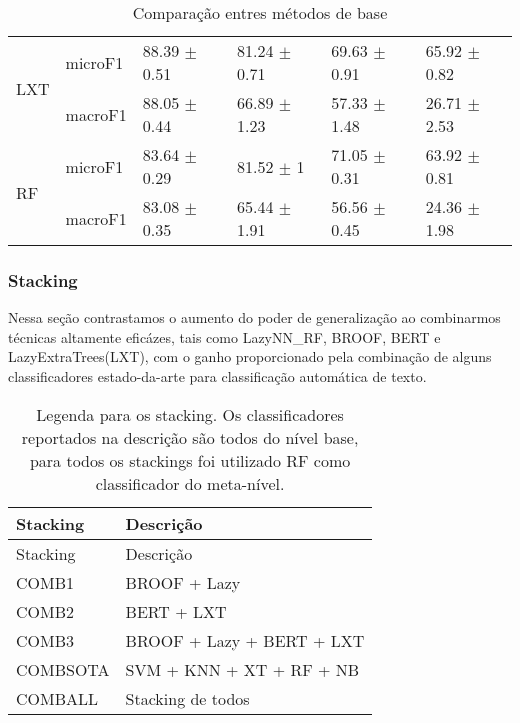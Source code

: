 \documentclass[]{article}
\begin{document}
\begin{table}[ht]
\begin{tabular}{llllll}
   \cline{3-6}\multirow{2}{*}{LXT} & microF1 & 88.39 $\pm$  0.51 & 81.24 $\pm$  0.71 & 69.63 $\pm$  0.91 & 65.92 $\pm$  0.82 \\ 
   & macroF1 & 88.05 $\pm$  0.44 & 66.89 $\pm$  1.23 & 57.33 $\pm$  1.48 & 26.71 $\pm$  2.53 \\ 
   \cline{3-6}\multirow{2}{*}{RF} & microF1 & 83.64 $\pm$  0.29 & 81.52 $\pm$  1 & 71.05 $\pm$  0.31 & 63.92 $\pm$  0.81 \\ 
   & macroF1 & 83.08 $\pm$  0.35 & 65.44 $\pm$  1.91 & 56.56 $\pm$  0.45 & 24.36 $\pm$  1.98 \\ 
   \cline{3-6}\end{tabular}
\caption{Comparação entres métodos de base} 
\label{tab:base}
\end{table}

\subsubsection{Stacking}\label{stacking-1}

Nessa seção contrastamos o aumento do poder de generalização ao
combinarmos técnicas altamente eficázes, tais como LazyNN\_RF, BROOF,
BERT e LazyExtraTrees(LXT), com o ganho proporcionado pela combinação de
alguns classificadores estado-da-arte para classificação automática de
texto.

\begin{longtable}[c]{@{}ll@{}}
\caption{Legenda para os stacking. Os classificadores reportados na
descrição são todos do nível base, para todos os stackings foi utilizado
RF como classificador do meta-nível.}\tabularnewline
\toprule
Stacking & Descrição\tabularnewline
\midrule
\endfirsthead
\toprule
Stacking & Descrição\tabularnewline
\midrule
\endhead
COMB1 & BROOF + Lazy\tabularnewline
COMB2 & BERT + LXT\tabularnewline
COMB3 & BROOF + Lazy + BERT + LXT\tabularnewline
COMBSOTA & SVM + KNN + XT + RF + NB\tabularnewline
COMBALL & Stacking de todos\tabularnewline
\bottomrule
\end{longtable}
\end{document}
